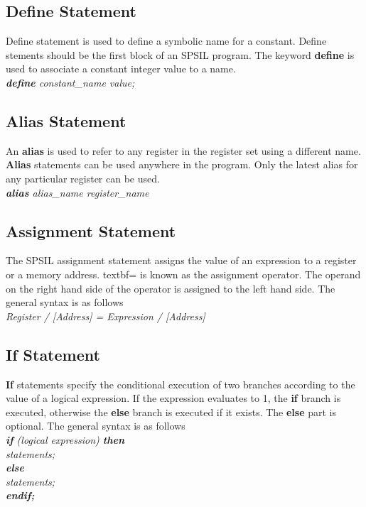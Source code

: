 \documentclass[11pt]{article}
\begin{document}
\subsection{Define Statement}
Define statement is used to define a symbolic name for a constant. Define stements should be the first block of an SPSIL program. The keyword \textbf{define} is used to associate a constant integer value to a name. \\

\textit{ \textbf{define} constant\_name value; }


\subsection{Alias Statement}
An \textbf{alias} is used to refer to any register in the register set using a different name. \textbf{Alias} statements can be used anywhere in the program. Only the latest alias for any particular register can be used.  \\
\indent \textit{ \textbf{alias}  alias\_name register\_name } \\


\subsection{Assignment Statement}
The SPSIL assignment statement assigns the value of an expression to a register  or a memory address. textbf{=} is known as the assignment operator. The operand on the right hand side of the operator is assigned to the left hand side. The general syntax is as follows \\

\indent \textit{ Register / [Address] = Expression / [Address] }


\subsection{If Statement}
\textbf{If} statements specify the conditional execution of two branches according to the value of a logical expression. If the expression evaluates to 1, the \textbf{if} branch is executed, otherwise the \textbf{else}  branch is executed if it exists. The \textbf{else} part is optional. The general syntax is as follows  \\

\textit{
\textbf{if} (logical expression) \textbf{then}  \\
 \indent \indent statements; \\
\indent \textbf{else} \\
\indent  \indent statements; \\
\indent \textbf{endif;}  \\
}
\end{document}

